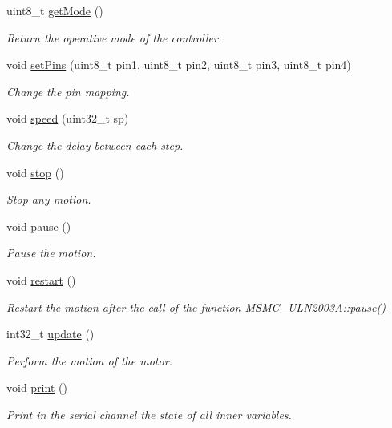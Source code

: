 \begin{DoxyCompactItemize}
uint8\+\_\+t \hyperlink{class_m_s_m_c___u_l_n2003_a_a84cbd656e77e789af5cb34df147589a3}{get\+Mode} ()
\begin{DoxyCompactList}\small\item\em Return the operative mode of the controller. \end{DoxyCompactList}\item 
void \hyperlink{class_m_s_m_c___u_l_n2003_a_a19320fa4543dd8e76e338737690df235}{set\+Pins} (uint8\+\_\+t pin1, uint8\+\_\+t pin2, uint8\+\_\+t pin3, uint8\+\_\+t pin4)
\begin{DoxyCompactList}\small\item\em Change the pin mapping. \end{DoxyCompactList}\item 
void \hyperlink{class_m_s_m_c___u_l_n2003_a_ad8df164c90b2205fb65c796632889f82}{speed} (uint32\+\_\+t sp)
\begin{DoxyCompactList}\small\item\em Change the delay between each step. \end{DoxyCompactList}\item 
void \hyperlink{class_m_s_m_c___u_l_n2003_a_aba5e18f20f31fd4d6e71f50821dfeee5}{stop} ()
\begin{DoxyCompactList}\small\item\em Stop any motion. \end{DoxyCompactList}\item 
void \hyperlink{class_m_s_m_c___u_l_n2003_a_aa1d3444465d59ca6c87f05f565dde4a2}{pause} ()
\begin{DoxyCompactList}\small\item\em Pause the motion. \end{DoxyCompactList}\item 
void \hyperlink{class_m_s_m_c___u_l_n2003_a_a19853d77f81c521091a55996899c1784}{restart} ()
\begin{DoxyCompactList}\small\item\em Restart the motion after the call of the function \hyperlink{class_m_s_m_c___u_l_n2003_a_aa1d3444465d59ca6c87f05f565dde4a2}{M\+S\+M\+C\+\_\+\+U\+L\+N2003\+A\+::pause()} \end{DoxyCompactList}\item 
int32\+\_\+t \hyperlink{class_m_s_m_c___u_l_n2003_a_a88c46f414c19fc81662abed58ce3fd92}{update} ()
\begin{DoxyCompactList}\small\item\em Perform the motion of the motor. \end{DoxyCompactList}\item 
void \hyperlink{class_m_s_m_c___u_l_n2003_a_aa6743162bdaba01ef1fc8a79f2519897}{print} ()
\begin{DoxyCompactList}\small\item\em Print in the serial channel the state of all inner variables. \end{DoxyCompactList}\end{DoxyCompactItemize}


